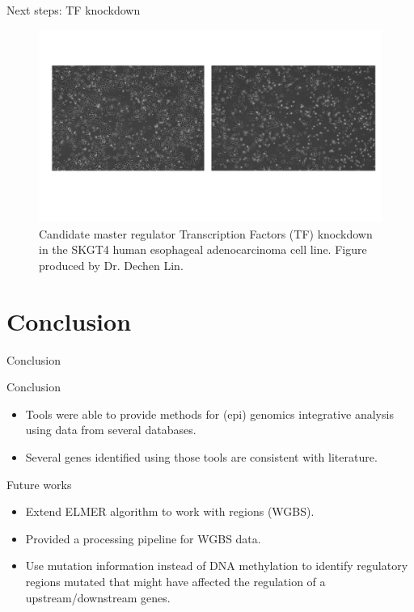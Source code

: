 \documentclass[slidestop,compress,11pt,xcolor=dvipsnames]{beamer}
\begin{document}
\begin{frame}{Next steps: TF knockdown}
 \begin{figure}[ht!]
  \centering
  \includegraphics[width=1.0\textwidth]{glioma/knockdown_TF_ESCA.pdf}
  \caption{Candidate master regulator Transcription Factors (TF) knockdown in the SKGT4 human esophageal adenocarcinoma cell line. Figure produced by Dr. Dechen Lin.}
 \end{figure}
\end{frame}

\section{Conclusion}
\begin{frame}{Conclusion}
\begin{block}{Conclusion}
  \begin{itemize}
    \item  Tools were able to provide methods for (epi) genomics integrative analysis
    using data from several databases.
    \item  Several genes identified using those tools are consistent with literature.
  \end{itemize}
\end{block}
\begin{block}{Future works}
  \begin{itemize}
    \item Extend ELMER algorithm to work with regions (WGBS).
    \item Provided a processing pipeline for WGBS data.
    \item Use mutation information instead of DNA methylation
to identify regulatory regions mutated that might have affected the
regulation of a upstream/downstream genes.
  \end{itemize}
\end{block}
\end{frame}
\end{document}
